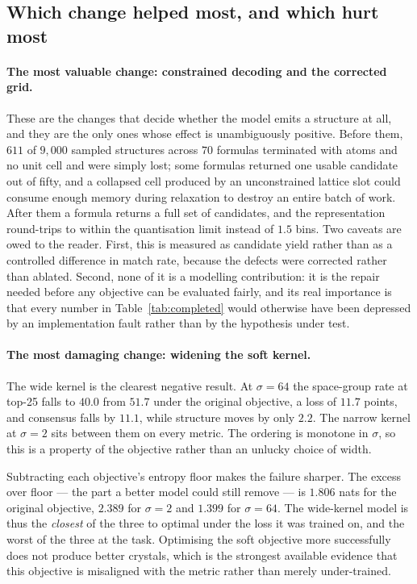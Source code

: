 \documentclass[manuscript,screen,review]{acmart}
\begin{document}
\subsection{Which change helped most, and which hurt most}
\label{sec:verdict}

\paragraph{The most valuable change: constrained decoding and the corrected
grid.}
These are the changes that decide whether the model emits a structure at all,
and they are the only ones whose effect is unambiguously positive. Before them,
$611$ of $9{,}000$ sampled structures across $70$ formulas terminated with atoms
and no unit cell and were simply lost; some formulas returned one usable
candidate out of fifty, and a collapsed cell produced by an unconstrained
lattice slot could consume enough memory during relaxation to destroy an entire
batch of work. After them a formula returns a full set of candidates, and the
representation round-trips to within the quantisation limit instead of $1.5$
bins. Two caveats are owed to the reader. First, this is measured as candidate
yield rather than as a controlled difference in match rate, because the defects
were corrected rather than ablated. Second, none of it is a modelling
contribution: it is the repair needed before any objective can be evaluated
fairly, and its real importance is that every number in
Table~\ref{tab:completed} would otherwise have been depressed by an
implementation fault rather than by the hypothesis under test.

\paragraph{The most damaging change: widening the soft kernel.}
The wide kernel is the clearest negative result. At $\sigma = 64$ the
space-group rate at top-25 falls to $40.0$ from $51.7$ under the original
objective, a loss of $11.7$ points, and consensus falls by $11.1$, while
structure moves by only $2.2$. The narrow kernel at $\sigma = 2$ sits between
them on every metric. The ordering is monotone in $\sigma$, so this is a
property of the objective rather than an unlucky choice of width.

Subtracting each objective's entropy floor makes the failure sharper. The
excess over floor --- the part a better model could still remove --- is $1.806$
nats for the original objective, $2.389$ for $\sigma = 2$ and $1.399$ for
$\sigma = 64$. The wide-kernel model is thus the \emph{closest} of the three to
optimal under the loss it was trained on, and the worst of the three at the
task. Optimising the soft objective more successfully does not produce better
crystals, which is the strongest available evidence that this objective is
misaligned with the metric rather than merely under-trained.
\end{document}
